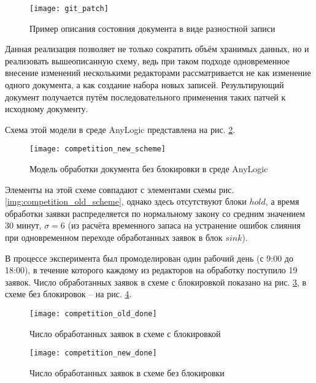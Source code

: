 \begin{figure}[h!]
  \centering
  \texttt{[image: git\_patch]}
  \caption{Пример описания состояния документа в виде разностной записи}
  \label{img:git_patch}
\end{figure}

Данная реализация позволяет не только сократить объём хранимых данных, но и реализовать вышеописанную схему, ведь при таком подходе одновременное внесение изменений несколькими редакторами рассматривается не как изменение одного документа, а как создание набора новых записей. Результирующий документ получается путём последовательного применения таких патчей к исходному документу.

\vspace{\baselineskip}
Схема этой модели в среде AnyLogic представлена на рис. \ref{img:competition_new_scheme}.

\begin{figure}[h!]
  \centering
  \texttt{[image: competition\_new\_scheme]}
  \caption{Модель обработки документа без блокировки в среде AnyLogic}
  \label{img:competition_new_scheme}
\end{figure}

\vspace{\baselineskip}
Элементы на этой схеме совпадают с элементами схемы рис. \ref{img:competition_old_scheme}, однако здесь отсутствуют блоки $hold$, а время обработки заявки распределяется по нормальному закону со средним значением 30 минут, $\sigma=6$ (из расчёта временного запаса на устранение ошибок слияния при одновременном переходе обработанных заявок в блок $sink$).

\vspace{\baselineskip}
В процессе эксперимента был промоделирован один рабочий день (с 9:00 до 18:00), в течение которого каждому из редакторов на обработку поступило 19 заявок. Число обработанных заявок в схеме с блокировкой показано на рис. \ref{img:competition_old_done}, в схеме без блокировок -- на рис. \ref{img:competition_new_done}.

\begin{figure}[h!]
  \centering
  \texttt{[image: competition\_old\_done]}
  \caption{Число обработанных заявок в схеме с блокировкой}
  \label{img:competition_old_done}
\end{figure}

\begin{figure}[h!]
  \centering
  \texttt{[image: competition\_new\_done]}
  \caption{Число обработанных заявок в схеме без блокировки}
  \label{img:competition_new_done}
\end{figure}

